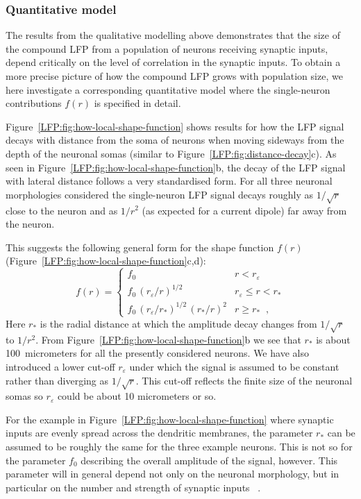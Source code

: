 \subsubsection{Quantitative model}

The results from the qualitative modelling above demonstrates that the size of the compound LFP 
from a population of neurons receiving synaptic inputs, depend critically on the level of 
correlation in the synaptic inputs. To obtain a more
precise picture of how the compound LFP grows with population size, we here investigate a 
corresponding quantitative model where the single-neuron contributions $f(r)$ is specified in detail.

Figure~\ref{LFP:fig:how-local-shape-function} shows results for how the LFP signal decays with distance from the soma of neurons when moving sideways from the depth of the neuronal somas
(similar to  Figure~\ref{LFP:fig:distance-decay}c). As seen in Figure~\ref{LFP:fig:how-local-shape-function}b, the decay of the LFP signal with lateral distance follows a very standardised form. For all three neuronal morphologies considered the single-neuron LFP signal decays roughly as $1/\sqrt{r}$ close to the neuron and as $1/r^2$ (as expected for a current dipole) far away from the neuron. 

This suggests the following general form for the shape function $f(r)$ 
(Figure~\ref{LFP:fig:how-local-shape-function}c,d):
%
\begin{equation}
  f(r)=
  \begin{cases}
    f_0 & r< r_\varepsilon \\
    f_0\,\left(r_\varepsilon/r\right)^{1/2} &  r_\varepsilon \le r < r_* \\
    f_0\,\left(r_\varepsilon/r_*\right)^{1/2}\,\left(r_*/r\right)^{2}  & r \ge r_* \;\;,
  \end{cases}
\label{LFP:equation:f-power-law}
\end{equation}
%
Here $r_*$ is the radial distance at which the amplitude decay changes from $1/\sqrt{r}$ to $1/r^2$.
From Figure~\ref{LFP:fig:how-local-shape-function}b we see that $r_*$ is about 100~micrometers for all the presently considered neurons. We have also introduced a lower cut-off $r_\varepsilon$ under 
which the signal is assumed to be constant rather than diverging as $1/\sqrt{r}$. This cut-off reflects the finite size of the neuronal somas so $r_\varepsilon$ could be about 10 micrometers or so. 

For the example in Figure~\ref{LFP:fig:how-local-shape-function} where synaptic inputs are evenly spread across the dendritic membranes, the parameter $r_*$ can be assumed to be roughly the same for the three example neurons. This is not so for the parameter $f_0$ describing the overall amplitude of the signal, however. This parameter will in general depend not only on the neuronal morphology, but in particular on the number and strength of synaptic inputs ~\citep{Linden2010,Linden2011,Einevoll2013a}.

